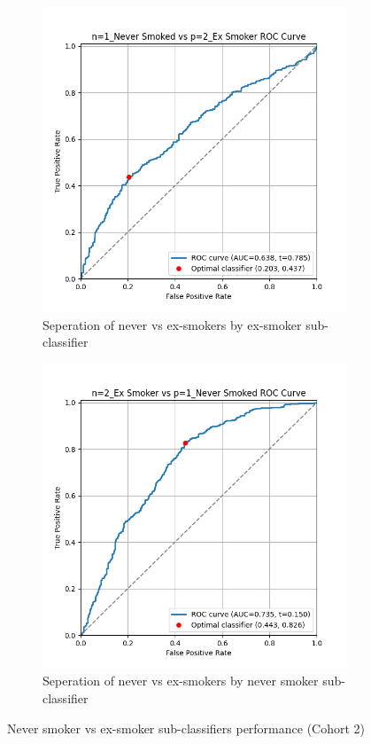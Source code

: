 \documentclass{article}
\begin{document}
\begin{figure}
    \begin{subfigure}{0.48\textwidth}
        \centering
        \includegraphics[width=\linewidth]{cohort2_1v2_roc.png}
        \caption{Seperation of never vs ex-smokers by ex-smoker sub-classifier}
    \end{subfigure}
    \hfill
    \begin{subfigure}{0.48\textwidth}
        \centering
        \includegraphics[width=\linewidth]{cohort2_2v1_roc.png}
        \caption{Seperation of never vs ex-smokers by never smoker sub-classifier}
    \end{subfigure}
    \caption{Never smoker vs ex-smoker sub-classifiers performance (Cohort 2)}
\end{figure}
\end{document}
